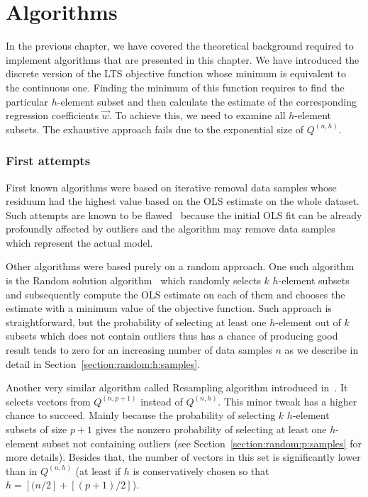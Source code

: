 \chapter{Algorithms}

In the previous chapter, we have covered the theoretical background required to implement algorithms that are presented in this chapter. We have introduced the discrete version of the LTS objective function whose minimum is equivalent to the continuous one. Finding the minimum of this function requires to find the particular $h$-element subset and then calculate the estimate of the corresponding regression coefficients $\vec{w}$. To achieve this, we need to examine all $h$-element subsets. The exhaustive approach fails due to the exponential size of $Q^{(n,h)}$.

\subsection{First attempts}
First known algorithms were based on iterative removal data samples whose residuum had the highest value based on the OLS estimate on the whole dataset. Such attempts are known to be flawed~\cite{hawkins:1994} because the initial OLS fit can be already profoundly affected by outliers and the algorithm may remove data samples which represent the actual model.

Other algorithms were based purely on a random approach. One such algorithm is the Random solution algorithm~\cite{bai2003random} which randomly selects $k$ $h$-element subsets and subsequently compute the OLS estimate on each of them and chooses the estimate with a minimum value of the objective function.  Such approach is straightforward, but the probability of selecting at least one $h$-element out of $k$ subsets which does not contain outliers thus has a chance of producing good result tends to zero for an increasing number of data samples $n$ as we describe in detail in Section~\ref{section:random:h:samples}.

Another very similar algorithm called Resampling algorithm introduced in~\cite{rousseeuw1987robust}. It selects vectors from $Q^{(n,p+1)}$ instead of $Q^{(n, h)}$. This minor tweak has a higher chance to succeed. Mainly because the probability of selecting $k$ $h$-element subsets of size $p+1$ gives the nonzero probability of selecting at least one $h$-element subset not containing outliers (see Section~\ref{section:random:p:samples} for more details). Besides that, the number of vectors in this set is significantly lower than in $Q^{(n, h)}$ (at least if $h$ is conservatively chosen so that $h = [(n/2] + [(p+1)/2]$).
 
